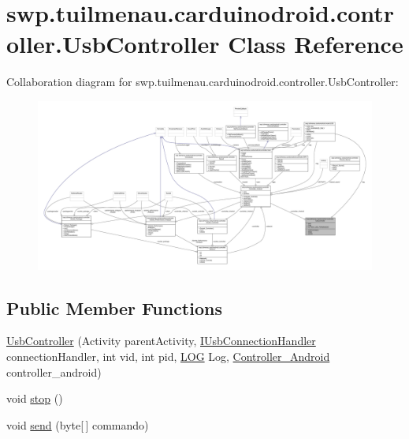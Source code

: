 \hypertarget{classswp_1_1tuilmenau_1_1carduinodroid_1_1controller_1_1_usb_controller}{}\section{swp.\+tuilmenau.\+carduinodroid.\+controller.\+Usb\+Controller Class Reference}
\label{classswp_1_1tuilmenau_1_1carduinodroid_1_1controller_1_1_usb_controller}


Collaboration diagram for swp.\+tuilmenau.\+carduinodroid.\+controller.\+Usb\+Controller\+:
\nopagebreak
\begin{figure}[H]
\begin{center}
\leavevmode
\includegraphics[width=350pt]{classswp_1_1tuilmenau_1_1carduinodroid_1_1controller_1_1_usb_controller__coll__graph}
\end{center}
\end{figure}
\subsection*{Public Member Functions}
\begin{DoxyCompactItemize}
\item 
\hyperlink{classswp_1_1tuilmenau_1_1carduinodroid_1_1controller_1_1_usb_controller_a49aa06782978ab1150cd4b12598723a4}{Usb\+Controller} (Activity parent\+Activity, \hyperlink{interfaceswp_1_1tuilmenau_1_1carduinodroid_1_1controller_1_1_i_usb_connection_handler}{I\+Usb\+Connection\+Handler} connection\+Handler, int vid, int pid, \hyperlink{classswp_1_1tuilmenau_1_1carduinodroid_1_1model_1_1_l_o_g}{L\+O\+G} Log, \hyperlink{classswp_1_1tuilmenau_1_1carduinodroid_1_1controller_1_1_controller___android}{Controller\+\_\+\+Android} controller\+\_\+android)
\item 
void \hyperlink{classswp_1_1tuilmenau_1_1carduinodroid_1_1controller_1_1_usb_controller_aad2ce37fa78ebb224974eee0b71aac44}{stop} ()
\item 
void \hyperlink{classswp_1_1tuilmenau_1_1carduinodroid_1_1controller_1_1_usb_controller_a7b1a2e2fe0ba3f44d78634e388e2092e}{send} (byte\mbox{[}$\,$\mbox{]} commando)
\end{DoxyCompactItemize}
